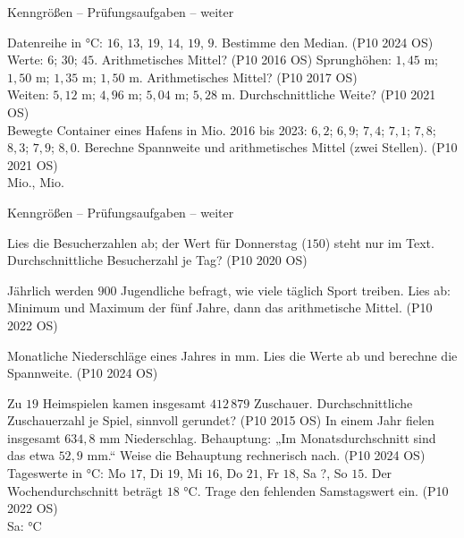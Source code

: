 \begin{aufgabe}{Kenngrößen – Prüfungsaufgaben – weiter}
\begin{teile}
\teil Datenreihe in °C: $16$, $13$, $19$, $14$, $19$, $9$. Bestimme den Median. \hfill (P10 2024 OS)
\teil Werte: $6$; $30$; $45$. Arithmetisches Mittel? \hfill (P10 2016 OS)
\teil Sprunghöhen: $1{,}45$ m; $1{,}50$ m; $1{,}35$ m; $1{,}50$ m. Arithmetisches Mittel? \hfill (P10 2017 OS) \\ \leerfeld[m]
\teil Weiten: $5{,}12$ m; $4{,}96$ m; $5{,}04$ m; $5{,}28$ m. Durchschnittliche Weite? \hfill (P10 2021 OS) \\ \leerfeld[m]
\teil Bewegte Container eines Hafens in Mio. 2016 bis 2023: $6{,}2$; $6{,}9$; $7{,}4$; $7{,}1$; $7{,}8$; $8{,}3$; $7{,}9$; $8{,}0$. Berechne Spannweite und arithmetisches Mittel (zwei Stellen). \hfill (P10 2021 OS) \\ \leerfeld Mio., \leerfeld Mio.
\end{teile}
\end{aufgabe}

\begin{aufgabe}{Kenngrößen – Prüfungsaufgaben – weiter}
\begin{teile}
\teil Lies die Besucherzahlen ab; der Wert für Donnerstag ($150$) steht nur im Text. Durchschnittliche Besucherzahl je Tag? \hfill (P10 2020 OS)

\teil Jährlich werden $900$ Jugendliche befragt, wie viele täglich Sport treiben. Lies ab: Minimum und Maximum der fünf Jahre, dann das arithmetische Mittel. \hfill (P10 2022 OS)

\teil Monatliche Niederschläge eines Jahres in mm. Lies die Werte ab und berechne die Spannweite. \hfill (P10 2024 OS)

\teil Zu $19$ Heimspielen kamen insgesamt $412\,879$ Zuschauer. Durchschnittliche Zuschauerzahl je Spiel, sinnvoll gerundet? \hfill (P10 2015 OS)
\teil In einem Jahr fielen insgesamt $634{,}8$ mm Niederschlag. Behauptung: „Im Monatsdurchschnitt sind das etwa $52{,}9$ mm.“ Weise die Behauptung rechnerisch nach. \hfill (P10 2024 OS)
\teil Tageswerte in °C: Mo $17$, Di $19$, Mi $16$, Do $21$, Fr $18$, Sa ?, So $15$. Der Wochendurchschnitt beträgt $18$ °C. Trage den fehlenden Samstagswert ein. \hfill (P10 2022 OS) \\ Sa: \leerfeld °C
\end{teile}
\end{aufgabe}

